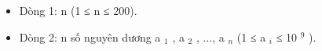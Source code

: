 \begin{itemize}
	\item     Dòng 1: n (1 ≤ n ≤ 200).   
	\item     Dòng 2: n số nguyên dương a    $_     1    $    , a    $_     2    $    , ..., a    $_     n    $    (1 ≤ a    $_     i    $    ≤ 10    $^     9    $    ).   
\end{itemize}